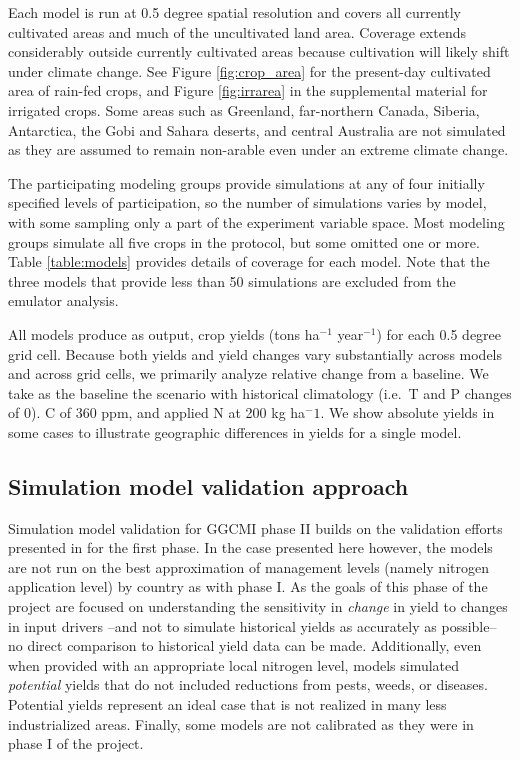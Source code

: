 \documentclass[preprint, 5p, times, twocolumn]{elsarticle}
\begin{document}
Each model is run at 0.5 degree spatial resolution and covers all currently cultivated areas and much of the uncultivated land area.  Coverage extends considerably outside currently cultivated areas because cultivation will likely shift under climate change. See Figure \ref{fig:crop_area} for the present-day cultivated area of rain-fed crops, and Figure \ref{fig:irrarea} in the supplemental material for irrigated crops. Some areas such as Greenland, far-northern Canada, Siberia, Antarctica, the Gobi and Sahara deserts, and central Australia are not simulated as they are assumed to remain non-arable even under an extreme climate change.  

The participating modeling groups provide simulations at any of four initially specified levels of participation, so the number of simulations varies by model, with some sampling only a part of the experiment variable space. Most modeling groups simulate all five crops in the protocol, but some omitted one or more. Table \ref{table:models} provides details of coverage for each model. Note that the three models that provide less than 50 simulations are excluded from the emulator analysis. 

All models produce as output, crop yields (tons ha$^{-1}$ year$^{-1}$) for each 0.5 degree grid cell. Because both yields and yield changes vary substantially across models and across grid cells, we primarily analyze relative change from a baseline. We take as the baseline the scenario with historical climatology (i.e.\ T and P changes of 0). C of 360 ppm, and applied N at 200 kg ha$^-1$.  We show absolute yields in some cases to illustrate geographic differences in yields for a single model. 

\subsection{Simulation model validation approach}
Simulation model validation for GGCMI phase II builds on the validation efforts presented in \citet{muller_global_2017} for the first phase. In the case presented here however, the models are not run on the best approximation of management levels (namely nitrogen application level) by country as with phase I. As the goals of this phase of the project are focused on understanding the sensitivity in \textit{change} in yield to changes in input drivers --and not to simulate historical yields as accurately as possible-- no direct comparison to historical yield data can be made. Additionally, even when provided with an appropriate local nitrogen level, models simulated \textit{potential} yields that do not included reductions from pests, weeds, or diseases. Potential yields represent an ideal case that is not realized in many less industrialized areas. Finally, some models are not calibrated as they were in phase I of the project.
\end{document}
